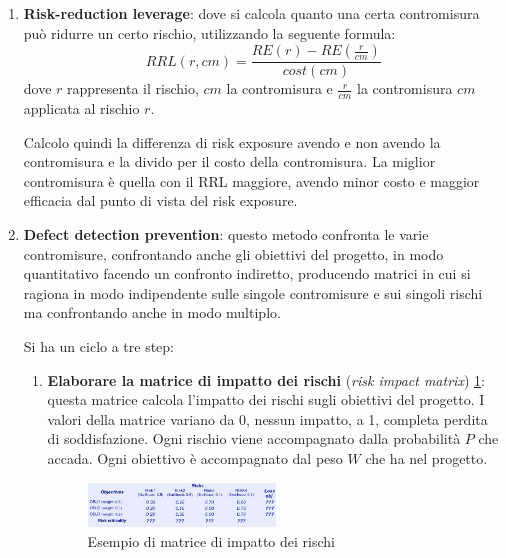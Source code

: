 \begin{enumerate}
    \item \textbf{Risk-reduction leverage}: dove si calcola quanto una certa
          contromisura può ridurre un certo rischio, utilizzando la seguente
          formula:
          \begin{equation}
              RRL(r, cm) = \frac{RE(r) - RE(\frac{r}{cm})}{cost(cm)}
          \end{equation}
          dove $r$ rappresenta il rischio, $cm$ la contromisura e $\frac{r}{cm}$
          la contromisura $cm$ applicata al rischio $r$.

          Calcolo quindi la differenza di risk exposure avendo e non avendo la
          contromisura e la divido per il costo della contromisura. La miglior
          contromisura è quella con il RRL maggiore, avendo minor costo e maggior
          efficacia dal punto di vista del risk exposure.
    \item \textbf{Defect detection prevention}: questo metodo confronta le varie
          contromisure, confrontando anche gli obiettivi del progetto, in modo
          quantitativo facendo un confronto indiretto, producendo matrici in cui
          si ragiona in modo indipendente sulle singole contromisure e sui singoli
          rischi ma confrontando anche in modo multiplo.

          Si ha un ciclo a tre step:
          \begin{enumerate}
              \item \textbf{Elaborare la matrice di impatto dei rischi} (\textit{risk
                        impact matrix}) \ref{fig:impact-matrix}: questa matrice
                    calcola l'impatto dei rischi sugli obiettivi del progetto.
                    I valori della matrice variano da 0, nessun impatto, a 1,
                    completa perdita di soddisfazione. Ogni rischio viene
                    accompagnato dalla probabilità $P$ che accada. Ogni obiettivo
                    è accompagnato dal peso $W$ che ha nel progetto.
                    \begin{figure}[!ht]
                        \centering
                        \includegraphics[width=0.5\textwidth]{img/risk/riskImpact.png}
                        \caption{Esempio di matrice di impatto dei rischi}
                        \label{fig:impact-matrix}
                    \end{figure}


\end{enumerate}
\end{enumerate}
